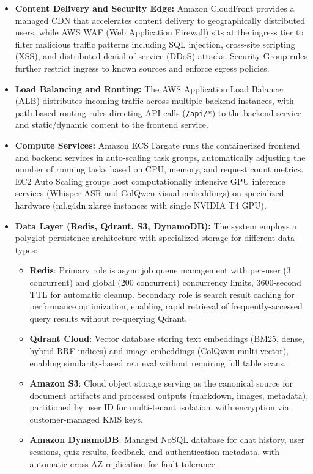 \begin{itemize}
    \item \textbf{Content Delivery and Security Edge:} Amazon CloudFront provides a managed CDN that accelerates content delivery to geographically distributed users, while AWS WAF (Web Application Firewall) sits at the ingress tier to filter malicious traffic patterns including SQL injection, cross-site scripting (XSS), and distributed denial-of-service (DDoS) attacks. Security Group rules further restrict ingress to known sources and enforce egress policies.

    \item \textbf{Load Balancing and Routing:} The AWS Application Load Balancer (ALB) distributes incoming traffic across multiple backend instances, with path-based routing rules directing API calls (\texttt{/api/*}) to the backend service and static/dynamic content to the frontend service.

    \item \textbf{Compute Services:} Amazon ECS Fargate runs the containerized frontend and backend services in auto-scaling task groups, automatically adjusting the number of running tasks based on CPU, memory, and request count metrics. EC2 Auto Scaling groups host computationally intensive GPU inference services (Whisper ASR and ColQwen visual embeddings) on specialized hardware (ml.g4dn.xlarge instances with single NVIDIA T4 GPU).

    \item \textbf{Data Layer (Redis, Qdrant, S3, DynamoDB):} The system employs a polyglot persistence architecture with specialized storage for different data types:
    \begin{itemize}
        \item \textbf{Redis}: Primary role is async job queue management with per-user (3 concurrent) and global (200 concurrent) concurrency limits, 3600-second TTL for automatic cleanup. Secondary role is search result caching for performance optimization, enabling rapid retrieval of frequently-accessed query results without re-querying Qdrant.
        \item \textbf{Qdrant Cloud}: Vector database storing text embeddings (BM25, dense, hybrid RRF indices) and image embeddings (ColQwen multi-vector), enabling similarity-based retrieval without requiring full table scans.
        \item \textbf{Amazon S3}: Cloud object storage serving as the canonical source for document artifacts and processed outputs (markdown, images, metadata), partitioned by user ID for multi-tenant isolation, with encryption via customer-managed KMS keys.
        \item \textbf{Amazon DynamoDB}: Managed NoSQL database for chat history, user sessions, quiz results, feedback, and authentication metadata, with automatic cross-AZ replication for fault tolerance.
    \end{itemize}


\end{itemize}
